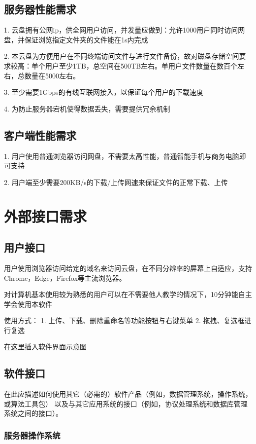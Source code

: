 \subsection{服务器性能需求}
 
1. 云盘拥有公网ip，供全网用户访问，并发量应做到：允许1000用户同时访问网盘，并保证浏览指定文件夹的文件能在1s内完成

2. 本云盘为方便用户在不同终端访问文件与进行文件备份，故对磁盘存储空间要求较高：单个用户至少1TB，总空间在500TB左右。单用户文件数量在数百个左右，总数量在5000左右。

3. 至少需要1Gbps的有线互联网接入，以保证每个用户的下载速度

4. 为防止服务器宕机使得数据丢失，需要提供冗余机制

\subsection{客户端性能需求}

1. 用户使用普通浏览器访问网盘，不需要太高性能，普通智能手机与商务电脑即可支持

2. 用户端至少需要200KB/s的下载/上传网速来保证文件的正常下载、上传

\section{外部接口需求}
\subsection{用户接口}

用户使用浏览器访问给定的域名来访问云盘，在不同分辨率的屏幕上自适应，支持Chrome，Edge，Firefox等主流浏览器。

对计算机基本使用较为熟悉的用户可以在不需要他人教学的情况下，10分钟能自主学会使用本软件

使用方式：
1. 上传、下载、删除重命名等功能按钮与右键菜单
2. 拖拽、复选框进行复选

在这里插入软件界面示意图

\subsection{软件接口}

在此应描述如何使用其它（必需的）软件产品（例如，数据管理系统，操作系统，或算法工具包）
以及与其它应用系统的接口（例如，协议处理系统和数据库管理系统之间的接口）。

\subsubsection{服务器操作系统}

